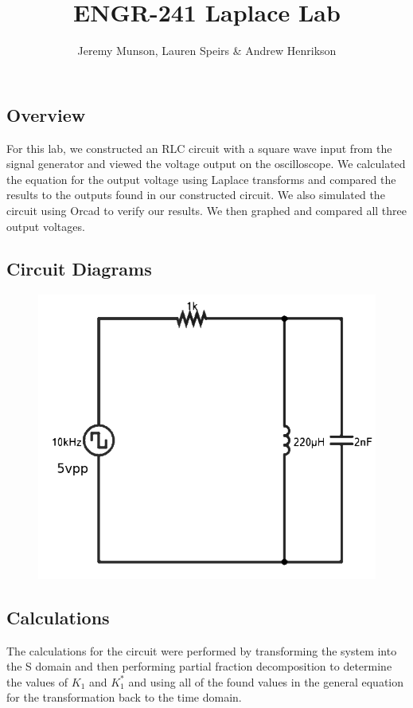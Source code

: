 \documentclass[11pt]{article}
\title{ENGR-241 Laplace Lab}
\author{Jeremy Munson, Lauren Speirs \& Andrew Henrikson}
\begin{document}
	\maketitle
	\subsection*{Overview}
	For this lab, we constructed an RLC circuit with a square wave input from the signal generator and viewed the voltage output on the oscilloscope. We calculated the equation for the output voltage using  Laplace transforms and compared the results to the outputs found in our constructed circuit. We also simulated the circuit using Orcad to verify our results. We then graphed and compared all three output voltages.
	\subsection*{Circuit Diagrams}
	
	\begin{figure}[H]
		\centering
		\includegraphics[width=5in]{images/basic diagram.png}
	\end{figure}
	
	\subsection*{Calculations}
	The calculations for the circuit were performed by transforming the system into the S domain and then performing partial fraction decomposition to determine the values of $K_{1}$ and $K^{*}_{1}$ and using all of the found values in the general equation for the transformation back to the time domain.
	\vspace{-15px}
\end{document}
